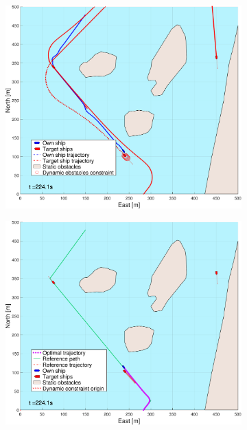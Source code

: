 \begin{figure}[ht]
\begin{subfigure}[b]{0.494\textwidth}
        \subcaption{}
    \end{subfigure}
    \hfill
    \\
    \begin{subfigure}[b]{0.494\textwidth}
        \centering
        \includegraphics[width=\textwidth]{Images/NewFigures/Helloya_Rev/_Simple_1fig1_time=225}
        \subcaption{}
    \end{subfigure}
    \hfill
    \begin{subfigure}[b]{0.494\textwidth}
        \centering
        \includegraphics[width=\textwidth]{Images/NewFigures/Helloya_Rev/_Simple_1fig999_time=225}

\end{subfigure}
\end{figure}
